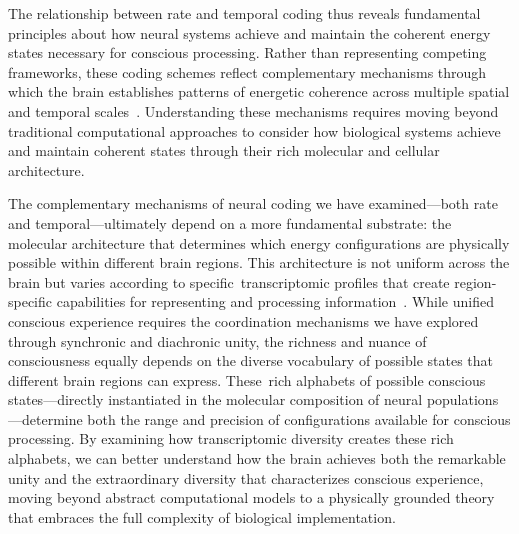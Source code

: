 The relationship between rate and temporal coding thus reveals fundamental principles about how neural systems achieve and maintain the coherent energy states necessary for conscious processing. Rather than representing competing frameworks, these coding schemes reflect complementary mechanisms through which the brain establishes patterns of energetic coherence across multiple spatial and temporal scales~\cite{amil2024theta}. Understanding these mechanisms requires moving beyond traditional computational approaches to consider how biological systems achieve and maintain coherent states through their rich molecular and cellular architecture.

The complementary mechanisms of neural coding we have examined—both rate and temporal—ultimately depend on a more fundamental substrate: the molecular architecture that determines which energy configurations are physically possible within different brain regions. This architecture is not uniform across the brain but varies according to specific~transcriptomic profiles that create region-specific capabilities for representing and processing information~\cite{siletti2023transcriptomic, bakken2021comparative}. While unified conscious experience requires the coordination mechanisms we have explored through synchronic and diachronic unity, the richness and nuance of consciousness equally depends on the diverse vocabulary of possible states that different brain regions can express. These~rich alphabets of possible conscious states—directly instantiated in the molecular composition of neural populations—determine both the range and precision of configurations available for conscious processing. By examining how transcriptomic diversity creates these rich alphabets, we can better understand how the brain achieves both the remarkable unity and the extraordinary diversity that characterizes conscious experience, moving beyond abstract computational models to a physically grounded theory that embraces the full complexity of biological implementation.
